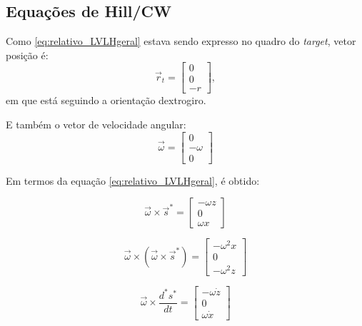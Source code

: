 \subsection{Equações de Hill/CW}

Como \eqref{eq:relativo_LVLHgeral} estava sendo expresso no quadro do \emph{target}, vetor posição é:
\begin{equation}
\label{eq:posicao_LVLH_target}
\vec r_t
=
\begin{bmatrix}
0 \\
0 \\
-r
\end{bmatrix},
\end{equation}
em que está seguindo a orientação dextrogiro.

E também o vetor de velocidade angular:
\begin{equation}
\label{eq:velocidadeAngular_LVLH_target}
\vec\omega=
\begin{bmatrix}
0 \\
-\omega \\
0
\end{bmatrix}
\end{equation}

Em termos da equação \eqref{eq:relativo_LVLHgeral}, é obtido:

\begin{equation}
\label{eq:velAngular_cross_s}
\vec\omega \times \vec s^* =
\begin{bmatrix}
-\omega z \\
0         \\
\omega x
\end{bmatrix} 
\end{equation}

\begin{equation}
\label{eq:velAngular_cross_cross_s}
\vec\omega \times (\vec\omega \times \vec s^*)
=
\begin{bmatrix}
-\omega^2 x \\
0           \\
-\omega^2 z 
\end{bmatrix}
\end{equation}

\begin{equation}
\label{eq:omega_cross_dsdt}
\vec\omega \times \frac{d^* s^*}{dt}
=
\begin{bmatrix}
-\omega \dot z \\
0 \\
\omega \dot x
\end{bmatrix}
\end{equation}

